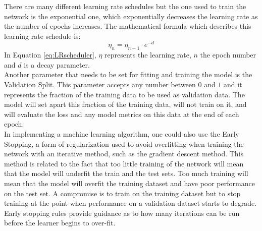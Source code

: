 \documentclass[12pt]{extarticle}
\begin{document}
There are many different learning rate schedules but the one used to train the network is the exponential one, which exponentially decreases the learning rate as the number of epochs increases. 
The mathematical formula which describes this learning rate schedule is:
\begin{equation}
\eta_n = \eta_{n-1} \cdot e^{-d}
\label{eq:LRscheduler}
\end{equation}
In Equation \eqref{eq:LRscheduler}, $\eta$ represents the learning rate, $n$ the epoch number and $d$ is a decay parameter. \\[4pt]
Another parameter that needs to be set for fitting and training the model is the Validation Split. This parameter accepts any number between $0$ and $1$ and it represents the fraction of the training data to be used as validation data. 
The model will set apart this fraction of the training data, will not train on it, and will evaluate the loss and any model metrics on this data at the end of each epoch. \\[4pt]
In implementing a machine learning algorithm, one could also use the Early Stopping, a form of regularization used to avoid overfitting when training the network with an iterative method, such as the gradient descent method.
This method is related to the fact that too little training of the network will mean that the model will underfit the train and the test sets. Too much training will mean that the model will overfit the training dataset and have poor performance on the test set.
A compromise is to train on the training dataset but to stop training at the point when performance on a validation dataset starts to degrade.
Early stopping rules provide guidance as to how many iterations can be run before the learner begins to over-fit.
\end{document}
